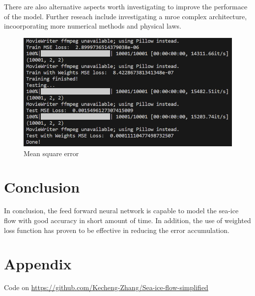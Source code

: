 \documentclass[12pt, a4paper]{article}
\begin{document}
There are also alternative aspects worth investigating to improve the performace of the model. Further reseach include investigating a mroe complex architecture, incoorporating more numerical methods and physical laws.

\begin{figure}
    \centering
    \includegraphics[scale=0.8]{../mse.png}
    \caption[]{Mean square error}
    \label{fig:mse}
\end{figure}

\section{Conclusion}
In conclusion, the feed forward neural network is capable to model the sea-ice flow with good accuracy in short amount of time. In addition, the use of weighted loss function has proven to be effective in reducing the error accumulation.

\newpage
\section{Appendix}
Code on 
\href{https://github.com/Kecheng-Zhang/Sea-ice-flow-simplified}{https://github.com/Kecheng-Zhang/Sea-ice-flow-simplified}
\end{document}
